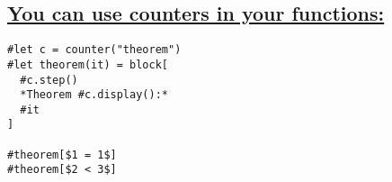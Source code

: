 \subsection{\texorpdfstring{\hyperref[you-can-use-counters-in-your-functions]{You
can use counters in your
functions:}}{You can use counters in your functions:}}\label{you-can-use-counters-in-your-functions}

\begin{verbatim}
#let c = counter("theorem")
#let theorem(it) = block[
  #c.step()
  *Theorem #c.display():*
  #it
]

#theorem[$1 = 1$]
#theorem[$2 < 3$]
\end{verbatim}

\pandocbounded{}
